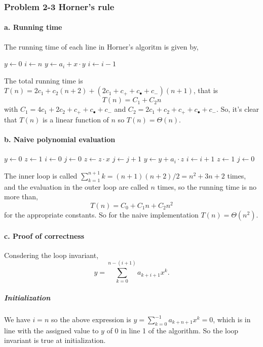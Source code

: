 \documentclass{article}
\begin{document}
\subsubsection*{Problem 2-3 Horner's rule}

\paragraph{a. Running time}
The running time of each line in Horner's algoritm is given by,

\begin{algorithmic}[1]
\State $y \gets 0$ 
\State $i \gets n$ 
   
	\State $y\gets a_i + x \cdot y$  
	\State $i \gets i - 1$ 
\EndWhile
\end{algorithmic}

The total running time is $T(n) = 2c_1 + c_2(n+2)+(2c_1 + c_{+} + c_{\bullet} + c_{-})(n+1)$, that is
\[
T(n) = C_1 + C_2n
\]
with $C_1 = 4c_1 + 2c_2 + c_{+} + c_{\bullet} + c_{-}$ and $C_2=2c_1 + c_2 + c_{+} + c_{\bullet} + c_{-}$. So, it's clear that $T(n)$ is a linear function of $n$ so $T(n) = \Theta(n)$.

\paragraph{b. Naive polynomial evaluation}

\begin{algorithmic}[1]
\State $y \gets 0$ 
\State $z \gets 1$ 
\State $i \gets 0$ 
\State $j \gets 0$ 
	 
		\State $z \gets z\cdot x$
		\State $j \gets j + 1$
	\EndWhile
	\State $y\gets y + a_i \cdot z$
	\State $i \gets i + 1$
	\State $z \gets 1$ 
	\State $j \gets 0$ 

\EndWhile
\end{algorithmic}

The inner loop is called $\sum_{k=1}^{n+1} k= (n+1)(n+2)/2 = n^2+3n+2$ times, and the evaluation in the outer loop are called $n$ times, so the running time is no more than,  
\[
T(n) = C_0 + C_1n + C_2n^2
\]
for the appropriate constants. So for the naive implementation $T(n)=\Theta(n^2)$.

\paragraph{c. Proof of correctness}
Consdering the loop invariant,
\[
y = \sum_{k=0}^{n-(i+1)}a_{k+i+1}x^k.
\]
\subparagraph{Initialization} We have $i=n$ so the above expression is $y = \sum_{k=0}^{-1} a_{k+n+1}x^k = 0$, which is in line with the assigned value to $y$ of 0 in line 1 of the algorithm. So the loop invariant is true at initialization.
\end{document}
